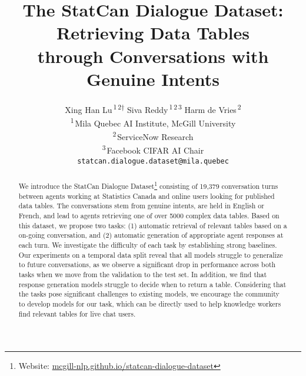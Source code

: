 \documentclass[11pt]{article}
\title{The StatCan Dialogue Dataset: Retrieving Data Tables\\ through Conversations with Genuine Intents}
\author{Xing Han Lu\textsuperscript{\,1\,2$\dagger$} \hspace{3em} Siva Reddy\textsuperscript{\,1\,2\,3} \hspace{3em} Harm de Vries\textsuperscript{\,2} \\
  \textsuperscript{1\,}Mila Quebec AI Institute, McGill University \\
  \textsuperscript{2\,}ServiceNow Research \\
  \textsuperscript{3\,}Facebook CIFAR AI Chair \\
  \texttt{statcan.dialogue.dataset@mila.quebec} \\}
\date{}
\begin{document}
\renewcommand{\sectionautorefname}{Section}
\renewcommand{\subsectionautorefname}{Section}
\renewcommand{\subsubsectionautorefname}{Section}

\maketitle

\def\thefootnote{$\dagger$}\def\thefootnote{\arabic{footnote}}

\begin{abstract}
We introduce the StatCan Dialogue Dataset\footnote{ Website: \href{https://mcgill-nlp.github.io/statcan-dialogue-dataset}{mcgill-nlp.github.io/statcan-dialogue-dataset} } consisting of 19,379 conversation turns between agents working at Statistics Canada and online users looking for published data tables. The conversations stem from genuine intents, are held in English or French, and lead to agents retrieving one of over 5000 complex data tables. Based on this dataset, we propose two tasks: (1) automatic retrieval of relevant tables based on a on-going conversation, and (2) automatic generation of appropriate agent responses at each turn. We investigate the difficulty of each task by establishing strong baselines. Our experiments on a temporal data split reveal that all models struggle to generalize to future conversations, as we observe a significant drop in performance across both tasks when we move from the validation to the test set. In addition, we find that response generation models struggle to decide when to return a table. Considering that the tasks pose significant challenges to existing models, we encourage the community to develop models for our task, which can be directly used to help knowledge workers find relevant tables for live chat users.

\end{abstract}
\end{document}
